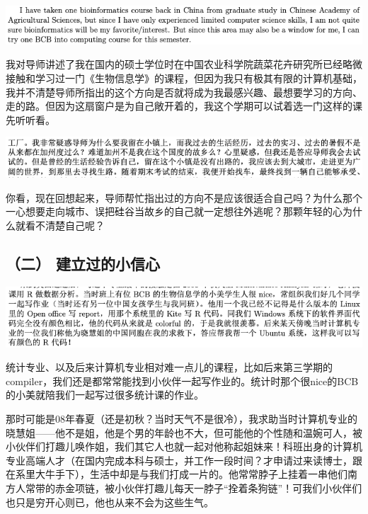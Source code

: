 \documentclass[9pt, b5paper]{article}
\begin{document}
\begin{center}
\includegraphics[width=.9\linewidth]{./pic/backups_plans_20210419_085406.png}
\end{center}

我对导师讲述了我在国内的硕士学位时在中国农业科学院蔬菜花卉研究所已经略微接触和学习过一门《生物信息学》的课程，但因为我只有极其有限的计算机基础，我并不清楚导师所指出的这个方向是否就将成为我最感兴趣、最想要学习的方向、走的路。但因为这扇窗户是为自己敞开着的，我这个学期可以试着选一门这样的课先听听看。

\begin{center}
\includegraphics[width=.9\linewidth]{./pic/backups_plans_20210425_095828.png}
\end{center}

你看，现在回想起来，导师帮忙指出过的方向不是应该很适合自己吗？为什么那个一心想要走向城市、误把硅谷当故乡的自己就一定想往外逃呢？那颗年轻的心为什么就看不清楚自己呢？

\subsection{（二） 建立过的小信心}
\label{sec:org3bfd6f7}

\begin{center}
\includegraphics[width=.9\linewidth]{./pic/backups_plans_20210422_090457.png}
\end{center}

统计专业、以及后来计算机专业相对难一点儿的课程，比如后来第三学期的compiler，我们还是都常常能找到小伙伴一起写作业的。统计时那个很nice的BCB的小美就陪我们一起写过很多统计课的作业。

那时可能是08年春夏（还是初秋？当时天气不是很冷），我求助当时计算机专业的晓慧姐——他不是姐，他是个男的年龄也不大，但可能他的个性随和温婉可人，被小伙伴们打趣儿唤作姐，我们其它人也就一起对他称起姐妹来！科班出身的计算机专业高端人才（在国内完成本科与硕士，并工作一段时间？才申请过来读博士，跟在系里大牛手下），生活中却是与我们打成一片的。他常常脖子上挂着一串他们南方人常带的赤金项链，被小伙伴打趣儿每天一脖子“拴着条狗链”！可我们小伙伴们也只是穷开心则已，他也从来不会为这些生气。
\end{document}
